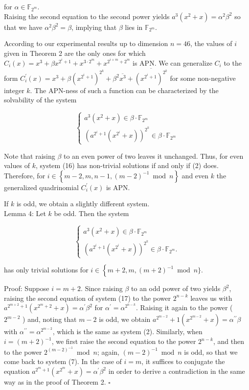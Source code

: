 \documentclass[10pt]{article}
\begin{document}
for $\alpha \in \mathbb{F}_{2^{m}}$.\\
Raising the second equation to the second power yields $a^{3}\left(x^{2}+x\right)=\alpha^{2} \beta^{2}$ so that we have $\alpha^{2} \beta^{2}=\beta$, implying that $\beta$ lies in $\mathbb{F}_{2^{m}}$.

According to our experimental results up to dimension $n=46$, the values of $i$ given in Theorem 2 are the only ones for which $C_{i}(x)=x^{3}+\beta x^{2^{i}+1}+x^{3 \cdot 2^{m}}+x^{2^{i+m}+2^{m}}$ is APN. We can generalize $C_{i}$ to the form $C_{i}^{\prime}(x)=x^{3}+ \beta\left(x^{2^{i}+1}\right)^{2^{k}}+\beta^{2} \overline{x^{3}}+\overline{\left(x^{2^{i}+1}\right)^{2^{k}}}$ for some non-negative integer $k$. The APN-ness of such a function can be characterized by the solvability of the system

\[
\left\{\begin{array}{l}
a^{3}\left(x^{2}+x\right) \in \beta \cdot \mathbb{F}_{2^{m}}  \tag{16}\\
\left(a^{2^{i}+1}\left(x^{2^{i}}+x\right)\right)^{2^{k}} \in \beta \cdot \mathbb{F}_{2^{m}}
\end{array}\right.
\]

Note that raising $\beta$ to an even power of two leaves it unchanged. Thus, for even values of $k$, system (16) has non-trivial solutions if and only if (2) does. Therefore, for $i \in\left\{m-2, m, n-1,(m-2)^{-1} \bmod n\right\}$ and even $k$ the generalized quadrinomial $C_{i}^{\prime}(x)$ is APN.

If $k$ is odd, we obtain a slightly different system.\\
Lemma 4: Let $k$ be odd. Then the system

\[
\left\{\begin{array}{l}
a^{3}\left(x^{2}+x\right) \in \beta \cdot \mathbb{F}_{2^{m}}  \tag{17}\\
\left(a^{2^{i}+1}\left(x^{2^{i}}+x\right)\right)^{2^{k}} \in \beta \cdot \mathbb{F}_{2^{m}} .
\end{array}\right.
\]

has only trivial solutions for $i \in\left\{m+2, m,(m+2)^{-1}\right. \bmod n\}$.

Proof: Suppose $i=m+2$. Since raising $\beta$ to an odd power of two yields $\beta^{2}$, raising the second equation of system (17) to the power $2^{n-k}$ leaves us with $a^{2^{m+2}+1}\left(x^{2^{m}+2}+x\right)=\alpha^{\prime} \beta^{2}$ for $\alpha^{\prime}=\alpha^{2^{n-k}}$. Raising it again to the power ( $2^{m-2}$ ) and, noting that $m-2$ is odd, we obtain $a^{2^{m-2}}+1\left(x^{2^{m-2}}+x\right)=\alpha^{\prime \prime} \beta$ with $\alpha^{\prime \prime}=\alpha^{2^{m-2}}$, which is the same as system (2). Similarly, when $i=(m+2)^{-1}$, we first raise the second equation to the power $2^{n-k}$, and then to the power $2^{(m-2)^{-1}} \bmod n$; again, $(m-2)^{-1} \bmod n$ is odd, so that we come back to system (7). In the case of $i=m$, it suffices to conjugate the equation $a^{2^{m}+1}\left(x^{2^{m}}+x\right)=\alpha^{\prime} \beta^{2}$ in order to derive a contradiction in the same way as in the proof of Theorem 2. \(\square\)
\end{document}
